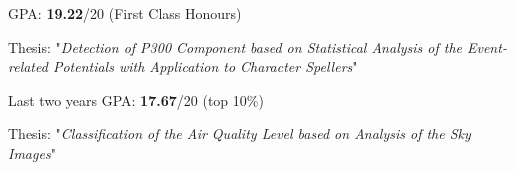 \documentclass[11pt,a4paper,ragged2e]{altacv}
\begin{document}


\clearpage




GPA: \textbf{19.22}/20 (First Class Honours) \vspace{1.5mm}

Thesis: "\textit{Detection of P300 Component based on Statistical Analysis of the Event-related Potentials with Application to Character Spellers}" \\

\divider


Last two years GPA: \textbf{17.67}/20 (top 10\%) \vspace{1.5mm}

Thesis: "\textit{Classification of the Air Quality Level based on Analysis of the Sky Images}"

\end{document}
